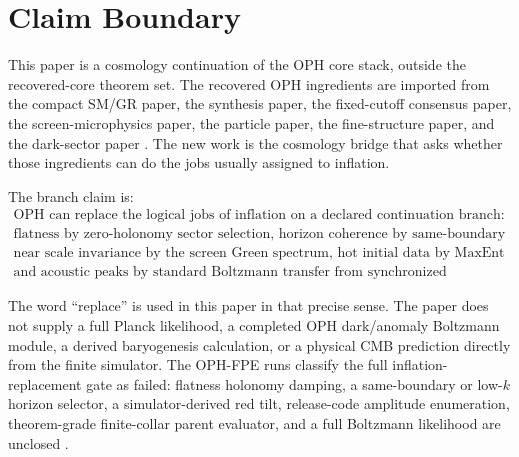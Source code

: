 \documentclass[11pt]{article}
\begin{document}
\tableofcontents
\newpage

\section{Claim Boundary}

This paper is a cosmology continuation of the OPH core stack, outside the recovered-core theorem
set. The recovered OPH ingredients are imported from the compact SM/GR paper, the synthesis paper, the
fixed-cutoff consensus paper, the screen-microphysics paper, the particle paper, the fine-structure
paper, and the dark-sector paper
\cite{ophcompact,ophsynthesis,ophconsensus,ophmicro,ophparticles,ophfine,ophdark}. The new work is
the cosmology bridge that asks whether those ingredients can do the jobs usually assigned to
inflation.

The branch claim is:
\[
\boxed{
\begin{gathered}
\text{OPH can replace the logical jobs of inflation on a declared continuation branch:}\\
\text{flatness by zero-holonomy sector selection, horizon coherence by same-boundary repair,}\\
\text{near scale invariance by the screen Green spectrum, hot initial data by MaxEnt release,}\\
\text{and acoustic peaks by standard Boltzmann transfer from synchronized adiabatic data.}
\end{gathered}}
\]

The word ``replace'' is used in this paper in that precise sense. The paper does not supply a full
Planck likelihood, a completed OPH dark/anomaly Boltzmann module, a derived baryogenesis calculation,
or a physical CMB prediction directly from the finite simulator. The OPH-FPE runs classify the
full inflation-replacement gate as failed:
flatness holonomy damping, a same-boundary or low-\(k\) horizon selector, a simulator-derived red
tilt, release-code amplitude enumeration, theorem-grade finite-collar parent evaluator, and a full
Boltzmann likelihood are unclosed
\cite{ophsim}.
\end{document}
